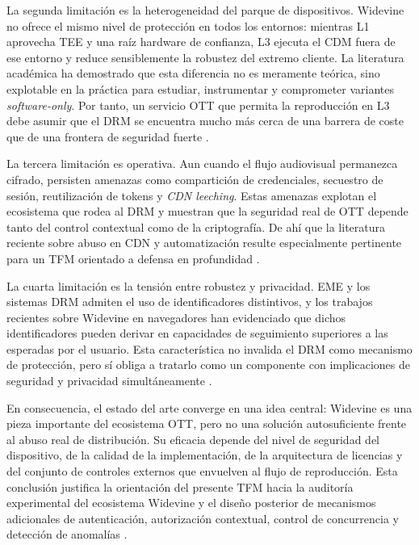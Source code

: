 La segunda limitación es la heterogeneidad del parque de dispositivos. Widevine no ofrece el mismo nivel de protección en todos los entornos: mientras L1 aprovecha TEE y una raíz hardware de confianza, L3 ejecuta el CDM fuera de ese entorno y reduce sensiblemente la robustez del extremo cliente. La literatura académica ha demostrado que esta diferencia no es meramente teórica, sino explotable en la práctica para estudiar, instrumentar y comprometer variantes \textit{software-only}. Por tanto, un servicio OTT que permita la reproducción en L3 debe asumir que el DRM se encuentra mucho más cerca de una barrera de coste que de una frontera de seguridad fuerte \cite{patat2022,rafi2023mobiledrm,widevine2024}.

La tercera limitación es operativa. Aun cuando el flujo audiovisual permanezca cifrado, persisten amenazas como compartición de credenciales, secuestro de sesión, reutilización de tokens y \textit{CDN leeching}. Estas amenazas explotan el ecosistema que rodea al DRM y muestran que la seguridad real de OTT depende tanto del control contextual como de la criptografía. De ahí que la literatura reciente sobre abuso en CDN y automatización resulte especialmente pertinente para un TFM orientado a defensa en profundidad \cite{rodrigues2024cdn,owasp-session-hijacking,owasp-credential-stuffing}.

La cuarta limitación es la tensión entre robustez y privacidad. EME y los sistemas DRM admiten el uso de identificadores distintivos, y los trabajos recientes sobre Widevine en navegadores han evidenciado que dichos identificadores pueden derivar en capacidades de seguimiento superiores a las esperadas por el usuario. Esta característica no invalida el DRM como mecanismo de protección, pero sí obliga a tratarlo como un componente con implicaciones de seguridad y privacidad simultáneamente \cite{w3ceme2026,patat2023}.

En consecuencia, el estado del arte converge en una idea central: Widevine es una pieza importante del ecosistema OTT, pero no una solución autosuficiente frente al abuso real de distribución. Su eficacia depende del nivel de seguridad del dispositivo, de la calidad de la implementación, de la arquitectura de licencias y del conjunto de controles externos que envuelven al flujo de reproducción. Esta conclusión justifica la orientación del presente TFM hacia la auditoría experimental del ecosistema Widevine y el diseño posterior de mecanismos adicionales de autenticación, autorización contextual, control de concurrencia y detección de anomalías \cite{w3ceme2026,patat2022,rafi2023mobiledrm,rodrigues2024cdn}.
